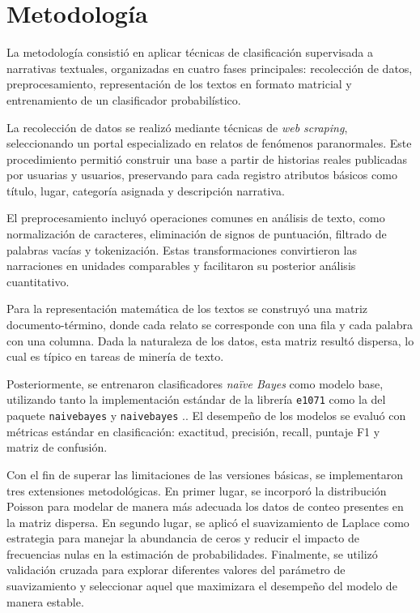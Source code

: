 \documentclass[eng]{ajceam-class}
\begin{document}
\section{Metodología}

La metodología consistió en aplicar técnicas de clasificación supervisada a narrativas textuales, organizadas en cuatro fases principales: recolección de datos, preprocesamiento, representación de los textos en formato matricial y entrenamiento de un clasificador probabilístico.  

La recolección de datos se realizó mediante técnicas de \textit{web scraping}, seleccionando un portal especializado en relatos de fenómenos paranormales. Este procedimiento permitió construir una base a partir de historias reales publicadas por usuarias y usuarios, preservando para cada registro atributos básicos como título, lugar, categoría asignada y descripción narrativa.  

El preprocesamiento incluyó operaciones comunes en análisis de texto, como normalización de caracteres, eliminación de signos de puntuación, filtrado de palabras vacías y tokenización\cite{wickham2023r4ds, wickham2019stringr}. Estas transformaciones convirtieron las narraciones en unidades comparables y facilitaron su posterior análisis cuantitativo.  

Para la representación matemática de los textos se construyó una matriz documento-término, donde cada relato se corresponde con una fila y cada palabra con una columna. Dada la naturaleza de los datos, esta matriz resultó dispersa, lo cual es típico en tareas de minería de texto\cite{wickham2023r4ds, wickham2019stringr}.  

Posteriormente, se entrenaron clasificadores \textit{naïve Bayes} como modelo base, utilizando tanto la implementación estándar de la librería \texttt{e1071} como la del paquete \texttt{naivebayes}\cite{meyer2021e1071} y \texttt{naivebayes} \cite{majka2019naivebayes}.. El desempeño de los modelos se evaluó con métricas estándar en clasificación: exactitud, precisión, recall, puntaje F1 y matriz de confusión.  

Con el fin de superar las limitaciones de las versiones básicas, se implementaron tres extensiones metodológicas. En primer lugar, se incorporó la distribución Poisson para modelar de manera más adecuada los datos de conteo presentes en la matriz dispersa. En segundo lugar, se aplicó el suavizamiento de Laplace como estrategia para manejar la abundancia de ceros y reducir el impacto de frecuencias nulas en la estimación de probabilidades. Finalmente, se utilizó validación cruzada para explorar diferentes valores del parámetro de suavizamiento y seleccionar aquel que maximizara el desempeño del modelo de manera estable.  
\end{document}

